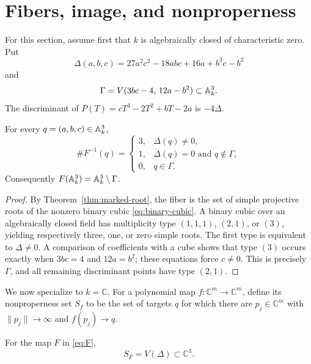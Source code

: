 \section{Fibers, image, and nonproperness}\label{sec:cubic-image}

For this section, assume first that $k$ is algebraically closed of
characteristic zero.  Put
\begin{equation}\label{eq:Qdisc}
 \Delta(a,b,c)=27a^2c^2-18abc+16a+b^3c-b^2
\end{equation}
and
\begin{equation}\label{eq:Gamma}
 \Gamma=V(3bc-4,\,12a-b^2)\subset\mathbb A^3_k.
\end{equation}
The discriminant of $P(T)=cT^3-2T^2+bT-2a$ is $-4\Delta$.

\begin{proposition}\label{prop:fibers-image}
For every $q=(a,b,c)\in\mathbb A^3_k$,
\[
 \#F^{-1}(q)=
 \begin{cases}
 3,&\Delta(q)\ne0,\\
 1,&\Delta(q)=0\text{ and }q\notin\Gamma,\\
 0,&q\in\Gamma.
 \end{cases}
\]
Consequently $F(\mathbb A^3_k)=\mathbb A^3_k\setminus\Gamma$.
\end{proposition}

\begin{proof}
By Theorem~\ref{thm:marked-root}, the fiber is the set of simple projective
roots of the nonzero binary cubic \eqref{eq:binary-cubic}.  A binary cubic
over an algebraically closed field has multiplicity type $(1,1,1)$,
$(2,1)$, or $(3)$, yielding respectively three, one, or zero simple roots.
The first type is equivalent to $\Delta\ne0$.  A comparison of coefficients
with a cube shows that type $(3)$ occurs exactly when
$3bc=4$ and $12a=b^2$; these equations force $c\ne0$.  This is precisely
$\Gamma$, and all remaining discriminant points have type $(2,1)$.
\end{proof}

We now specialize to $k=\mathbb C$.  For a polynomial map
$f:\mathbb C^m\to\mathbb C^m$, define its nonproperness set $S_f$ to be the
set of targets $q$ for which there are $p_j\in\mathbb C^m$ with
$\lVert p_j\rVert\to\infty$ and $f(p_j)\to q$.

\begin{proposition}\label{prop:nonproperness}
For the map $F$ in \eqref{eq:F},
\[
 S_F=V(\Delta)\subset\mathbb C^3.
\]
\end{proposition}

